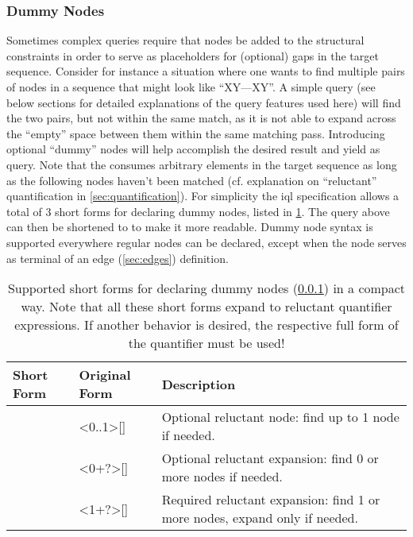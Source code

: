 \documentclass[11pt,a4paper]{report}
\begin{document}
\subsubsection{Dummy Nodes}
\label{sec:dummy-nodes}
\noindent Sometimes complex queries require that nodes be added to the structural constraints in order to serve as placeholders for (optional) gaps in the target sequence.
Consider for instance a situation where one wants to find multiple pairs of nodes  in a sequence that might look like ``XY---XY''.
A simple query  (see below sections for detailed explanations of the query features used here) will find the two  pairs, but not within the same match, as it is not able to expand across the ``empty'' space between them within the same matching pass.
Introducing optional ``dummy'' nodes will help accomplish the desired result and yield  as query.
Note that the  consumes arbitrary elements in the target sequence as long as the following  nodes haven't been matched (cf. explanation on ``reluctant'' quantification in \cref{sec:quantification}).
For simplicity the \ac{iql} specification allows a total of 3 short forms for declaring dummy nodes, listed in \cref{tab:dummy-nodes}.
The query above can then be shortened to  to make it more readable.
Dummy node syntax is supported everywhere regular nodes can be declared, except when the node serves as terminal of an edge (\ref{sec:edges}) definition.

\begin{table}[!htb]\centering
	\begin{tabular}{|p{}|p{}|p{}|}
		\hline 
		\textbf{Short Form} & \textbf{Original Form} & \textbf{Description} \\ 
		\hline 
		\hline  
		[?] & <0..1>[] & Optional reluctant node: find up to 1 node if needed. \\ 
		\hline  
		[*] & <0+?>[] & Optional reluctant expansion: find 0 or more nodes if needed. \\ 
		\hline  
		[+] & <1+?>[] & Required reluctant expansion: find 1 or more nodes, expand only if needed. \\ 
		\hline 
	\end{tabular}
	\caption[Dummy node short forms]{Supported short forms for declaring dummy nodes (\cref{sec:dummy-nodes}) in a compact way. Note that all these short forms expand to reluctant quantifier expressions. If another behavior is desired, the respective full form of the quantifier must be used!}
	\label{tab:dummy-nodes}
\end{table}
\end{document}
